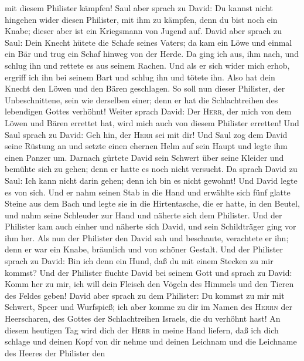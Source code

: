 mit diesem Philister kämpfen!  Saul aber sprach zu David:
Du kannst nicht hingehen wider diesen Philister, mit ihm zu kämpfen,
denn du bist noch ein Knabe; dieser aber ist ein Kriegsmann von Jugend
auf.  David aber sprach zu Saul: Dein Knecht hütete die
Schafe seines Vaters; da kam ein Löwe und einmal ein Bär und trug ein
Schaf hinweg von der Herde.  Da ging ich aus, ihm nach,
und schlug ihn und rettete es aus seinem Rachen. Und als er sich wider
mich erhob, ergriff ich ihn bei seinem Bart und schlug ihn und tötete
ihn.  Also hat dein Knecht den Löwen und den Bären
geschlagen. So soll nun dieser Philister, der Unbeschnittene, sein wie
derselben einer; denn er hat die Schlachtreihen des lebendigen Gottes
verhöhnt!  Weiter sprach David: Der \textsc{Herr}, der
mich von dem Löwen und Bären errettet hat, wird mich auch von diesem
Philister erretten! Und Saul sprach zu David: Geh hin, der \textsc{Herr}
sei mit dir!  Und Saul zog dem David seine Rüstung an und
setzte einen ehernen Helm auf sein Haupt und legte ihm einen Panzer um.
 Darnach gürtete David sein Schwert über seine Kleider
und bemühte sich zu gehen; denn er hatte es noch nicht versucht. Da
sprach David zu Saul: Ich kann nicht darin gehen; denn ich bin es nicht
gewohnt! Und David legte es von sich.  Und er nahm seinen
Stab in die Hand und erwählte sich fünf glatte Steine aus dem Bach und
legte sie in die Hirtentasche, die er hatte, in den Beutel, und nahm
seine Schleuder zur Hand und näherte sich dem Philister. 
Und der Philister kam auch einher und näherte sich David, und sein
Schildträger ging vor ihm her.  Als nun der Philister den
David sah und beschaute, verachtete er ihn; denn er war ein Knabe,
bräunlich und von schöner Gestalt.  Und der Philister
sprach zu David: Bin ich denn ein Hund, daß du mit einem Stecken zu mir
kommst?  Und der Philister fluchte David bei seinem Gott
und sprach zu David: Komm her zu mir, ich will dein Fleisch den Vögeln
des Himmels und den Tieren des Feldes geben!  David aber
sprach zu dem Philister: Du kommst zu mir mit Schwert, Speer und
Wurfspieß; ich aber komme zu dir im Namen des \textsc{Herrn} der
Heerscharen, des Gottes der Schlachtreihen Israels, die du verhöhnt
hast!  An diesem heutigen Tag wird dich der \textsc{Herr}
in meine Hand liefern, daß ich dich schlage und deinen Kopf von dir
nehme und deinen Leichnam und die Leichname des Heeres der Philister den

